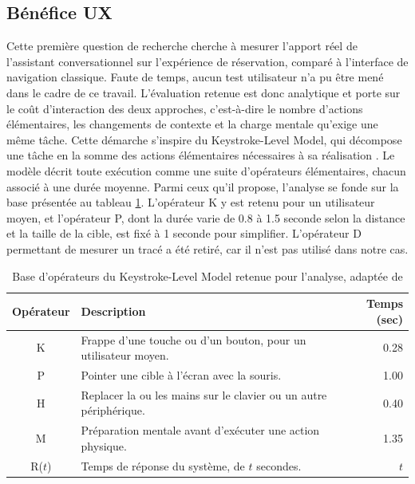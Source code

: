 \documentclass[12pt]{article}
\begin{document}
\subsection{Bénéfice UX}
Cette première question de recherche cherche à mesurer l'apport réel de l'assistant conversationnel sur l'expérience de réservation, comparé à l'interface de navigation classique. Faute de temps, aucun test utilisateur n'a pu être mené dans le cadre de ce travail. L'évaluation retenue est donc analytique et porte sur le coût d'interaction des deux approches, c'est-à-dire le nombre d'actions élémentaires, les changements de contexte et la charge mentale qu'exige une même tâche. Cette démarche s'inspire du Keystroke-Level Model, qui décompose une tâche en la somme des actions élémentaires nécessaires à sa réalisation \parencite{card_keystroke-level_1980}.
\newline\newline
Le modèle décrit toute exécution comme une suite d'opérateurs élémentaires, chacun associé à une durée moyenne. Parmi ceux qu'il propose, l'analyse se fonde sur la base présentée au tableau \ref{tab:klm_operators}. L'opérateur K y est retenu pour un utilisateur moyen, et l'opérateur P, dont la durée varie de 0.8 à 1.5 seconde selon la distance et la taille de la cible, est fixé à 1 seconde pour simplifier. L'opérateur D permettant de mesurer un tracé a été retiré, car il n'est pas utilisé dans notre cas.
\vspace{0.5cm}
\begin{table}[H]
    \centering
    \begin{tabularx}{\textwidth}{|c|X|r|}
    \hline
    \rowcolor[gray]{0.9}
    \textbf{Opérateur} & \textbf{Description} & \textbf{Temps (sec)} \\ \hline
    K & Frappe d'une touche ou d'un bouton, pour un utilisateur moyen. & 0.28 \\ \hline
    P & Pointer une cible à l'écran avec la souris. & 1.00 \\ \hline
    H & Replacer la ou les mains sur le clavier ou un autre périphérique. & 0.40 \\ \hline
    M & Préparation mentale avant d'exécuter une action physique. & 1.35 \\ \hline
    R($t$) & Temps de réponse du système, de $t$ secondes. & $t$ \\ \hline
    \end{tabularx}
    \caption{Base d'opérateurs du Keystroke-Level Model retenue pour l'analyse, adaptée de \parencite[p~399]{card_keystroke-level_1980}}
    \label{tab:klm_operators}
\end{table}
\end{document}
